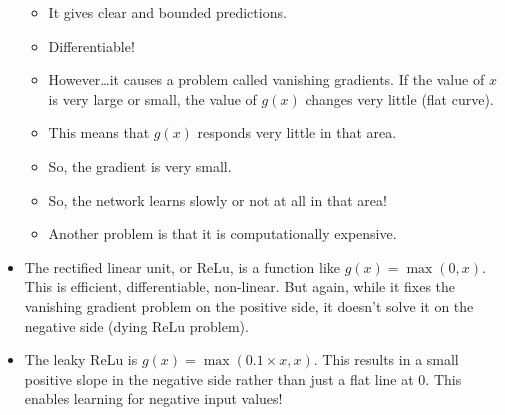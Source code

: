 \documentclass{article}
\begin{document}
\begin{itemize}
\begin{itemize}
            \item It gives clear and bounded predictions.
            \item Differentiable!
            \item However\dots it causes a problem called vanishing gradients.  If the value of $x$ is very large or small, the value of $g(x)$ changes very little (flat curve).
            \item This means that $g(x)$ responds very little in that area.
            \item So, the gradient is very small.
            \item So, the network learns slowly or not at all in that area! 
            \item Another problem is that it is computationally expensive.
        \end{itemize}
    \item The rectified linear unit, or ReLu, is a function like $g(x) = \max(0, x)$.  This is efficient, differentiable, non-linear.  But again, while it fixes the vanishing gradient problem on the positive side, it doesn't solve it on the negative side (dying ReLu problem).
    \item The leaky ReLu is $g(x) = \max(0.1 \times x, x)$.  This results in a small positive slope in the negative side rather than just a flat line at 0.  This enables learning for negative input values!
\end{itemize}
\end{document}
